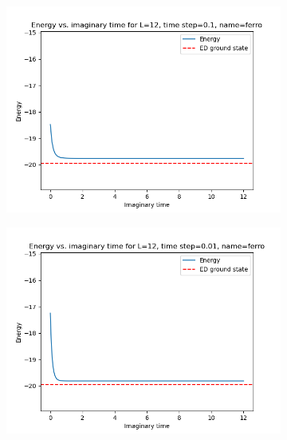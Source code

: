 \documentclass[12pt]{article}
\begin{document}
\begin{figure}
\begin{subfigure}{.5\textwidth}
  \centering
  \includegraphics[width=\linewidth]{p4_1_energy_L_12time_step_0.1name_ferro.png}
  \label{fig:1a}
\end{subfigure}
\begin{subfigure}{.5\textwidth}
  \centering
  \includegraphics[width=\linewidth]{p4_1_energy_L_12time_step_0.01name_ferro.png}
  \label{fig:1b}
\end{subfigure}
\begin{subfigure}{.5\textwidth}
  \centering

\end{subfigure}
\end{figure}
\end{document}
